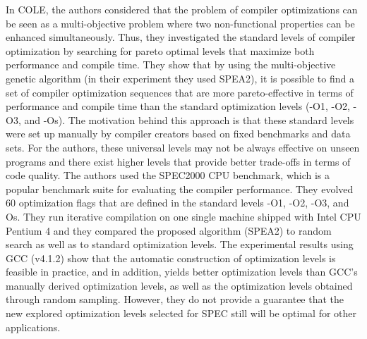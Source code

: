 In COLE\cite{hoste2008cole}, the authors considered that the problem of compiler optimizations can be seen as a multi-objective problem where two non-functional properties can be enhanced simultaneously. Thus, they investigated the standard levels of compiler optimization by searching for pareto optimal levels that maximize both performance and compile time. 
They show that by using the multi-objective genetic algorithm (in their experiment they used SPEA2), it is possible to find a set of compiler optimization sequences that are more pareto-effective in terms of performance and compile time than the standard optimization levels (-O1, -O2, -O3, and -Os). The motivation behind this approach is that these standard levels were set up manually by compiler creators based on fixed benchmarks and data sets. For the authors, these universal levels may not be always effective on unseen programs and there exist higher levels that provide better trade-offs in terms of code quality.
The authors used the SPEC2000 CPU benchmark, which is a popular benchmark suite for evaluating the compiler performance. They evolved 60 optimization flags that are defined in the standard levels -O1, -O2, -O3, and Os. They run iterative compilation on one single machine shipped with Intel CPU Pentium 4 and they compared the proposed algorithm (SPEA2) to random search as well as to standard optimization levels.
The experimental results using GCC (v4.1.2) show that the automatic construction of optimization levels is feasible in practice, and in addition, yields better optimization levels than GCC’s manually derived optimization levels, as well as the optimization levels obtained through random sampling.
However, they do not provide a guarantee that the new explored optimization levels selected for SPEC still will be optimal for other applications.


